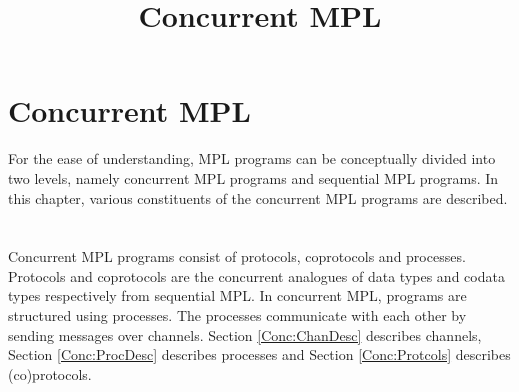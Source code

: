 \documentclass[11pt]{article}
\title{Concurrent MPL}
\newcommand{\<}{\langle}
\renewcommand{\>}{\rangle}
\begin{document}
\maketitle

\section {Concurrent MPL}
For the ease of understanding, MPL programs can be conceptually divided into two levels, namely concurrent MPL programs and sequential MPL programs. In this chapter, various constituents of the concurrent MPL programs are described.
~~\\~~\\ 
Concurrent MPL programs consist of protocols, coprotocols and processes. Protocols and coprotocols are the concurrent analogues of data types and codata types respectively from  sequential MPL. In concurrent MPL, programs are structured using processes. The processes communicate with each other by sending messages over channels. Section \ref {Conc:ChanDesc} describes channels, Section \ref {Conc:ProcDesc} describes processes and Section \ref {Conc:Protcols} describes (co)protocols.
\end{document}
